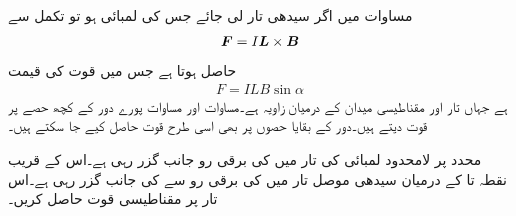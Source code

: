 مساوات  میں اگر سیدھی تار لی جائے جس کی لمبائی  ہو  تو تکمل سے
\begin{align}\label{مساوات_امالہ_سیدھی_تار_قوت_الف}
{\ensuremath{{\boldsymbol{F}}}}=I {{\boldsymbol{L}}} \times {\ensuremath{{\boldsymbol{B}}}}
\end{align}
حاصل ہوتا ہے جس میں قوت کی قیمت
\begin{align}\label{مساوات_امالہ_سیدھی_تار_قوت_ب}
F=I L B \sin \alpha
\end{align}
ہے جہاں تار اور مقناطیسی میدان کے درمیان زاویہ  ہے۔مساوات  اور مساوات  پورے دور کے کچھ حصے پر قوت دیتے ہیں۔دور کے بقایا حصوں پر بھی اسی طرح قوت حاصل کیے جا سکتے ہیں۔

محدد  پر لامحدود لمبائی کی تار میں  کی برقی رو  جانب گزر رہی ہے۔اس کے قریب نقطہ  تا
  کے درمیان سیدھی موصل تار میں  کی برقی رو  سے  کی جانب گزر رہی ہے۔اس تار پر مقناطیسی قوت حاصل کریں۔

